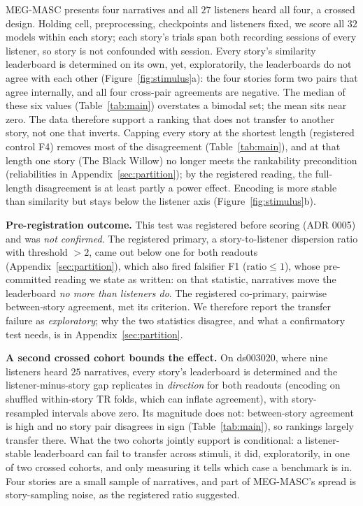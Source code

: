 \documentclass{article}
\begin{document}
MEG-MASC presents four narratives and all $27$ listeners heard all four, a crossed design. Holding cell, preprocessing, checkpoints and listeners fixed,
we score all $32$ models within each story; each story's trials span both recording sessions of
every listener, so story is not confounded with session. Every story's similarity leaderboard is
determined on its own, yet, exploratorily, the leaderboards do not agree with each
other (Figure~\ref{fig:stimulus}a): the four stories form two pairs that agree internally, and all
four cross-pair agreements are negative. The median of these six values (Table~\ref{tab:main}) overstates a bimodal set; the mean sits
near zero. The data therefore
support a ranking that does not transfer to another story, not one that inverts. Capping every story
at the shortest length (registered control F4) removes most of the disagreement (Table~\ref{tab:main}), and at that length one story (The Black
Willow) no longer meets the rankability precondition (reliabilities in Appendix~\ref{sec:partition}); by the registered reading, the full-length disagreement is at least
partly a power effect. Encoding is more stable than similarity but stays below the listener axis
(Figure~\ref{fig:stimulus}b).

\textbf{Pre-registration outcome.} This test was registered before scoring (ADR 0005) and was
\emph{not confirmed}. The registered primary, a story-to-listener dispersion ratio with threshold
$>2$, came out below one for both readouts (Appendix~\ref{sec:partition}), which also fired
falsifier F1 ($\text{ratio}\le1$), whose pre-committed reading we state as written: on that statistic,
narratives move the leaderboard \emph{no more than listeners do}. The registered co-primary,
pairwise between-story agreement, met its criterion. We therefore report the transfer failure as
\emph{exploratory}; why the two statistics disagree, and what a confirmatory test needs, is in
Appendix~\ref{sec:partition}.

\textbf{A second crossed cohort bounds the effect.} On ds003020, where nine listeners heard
$25$ narratives, every story's leaderboard is determined and the
listener-minus-story gap replicates in \emph{direction} for both readouts (encoding on shuffled
within-story TR folds, which can inflate agreement), with story-resampled intervals above zero. Its magnitude does not: between-story agreement is high and no story pair
disagrees in sign (Table~\ref{tab:main}), so rankings largely transfer there. What the two cohorts
jointly support is conditional: a listener-stable leaderboard can fail to transfer across stimuli,
it did, exploratorily, in one of two crossed cohorts, and only measuring it tells which case a benchmark is in.
Four stories are a small sample of narratives, and part of MEG-MASC's spread is story-sampling
noise, as the registered ratio suggested.
\end{document}
